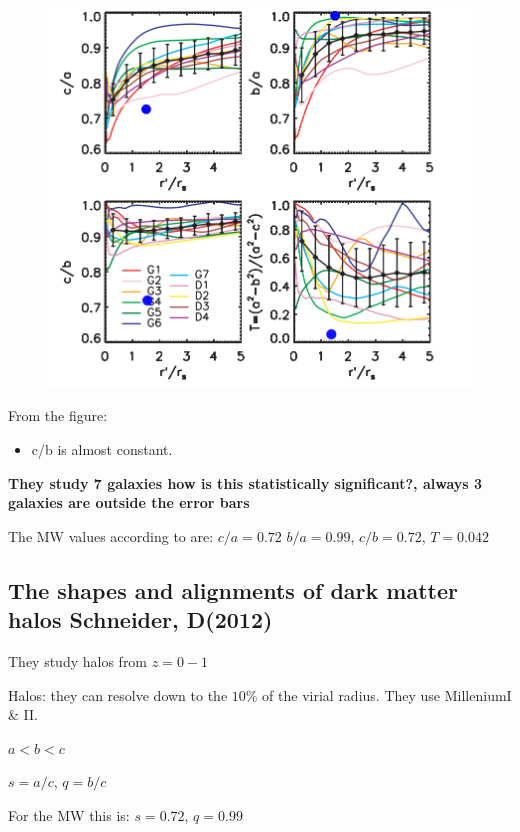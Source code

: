 \documentclass[12pt]{article}
\begin{document}
\begin{figure}[H]
\centering
\includegraphics[scale=0.5]{hayashimod.png}
\end{figure}

From the figure:

\begin{itemize}
\item c/b is almost constant. 
\end{itemize}

\textbf{They study 7 galaxies how is this statistically significant?, always 3 galaxies are outside the error bars }

The MW values according to \citep{Law10} are: $c/a = 0.72$ $b/a = 0.99$, $c/b = 0.72$, $T=0.042$

\subsection{The shapes and alignments of dark matter halos Schneider, D(2012)}

They study halos from $z=0-1$

Halos: they can resolve down to the $10\%$ of the virial radius. They use MilleniumI \& II.

$a<b<c$

$s=a/c$, $q=b/c$
  
For the MW this is: $s = 0.72 $, $q = 0.99 $
\end{document}
